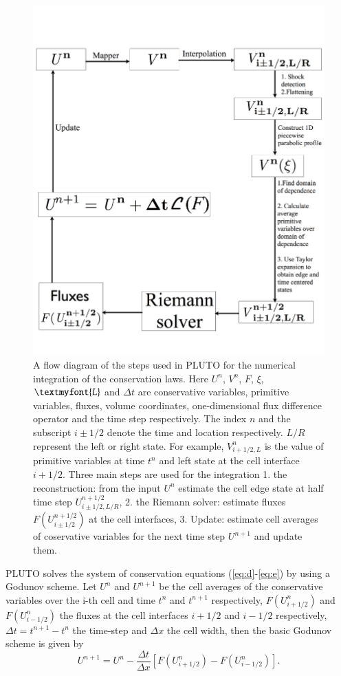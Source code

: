 \begin{figure}[h!]
\includegraphics[width=\textwidth]{pfc.png}
\caption{A flow diagram of the steps used in PLUTO for the numerical integration of the conservation laws. Here $U^n$, $V^n$, $F$, $\xi$, $\textmyfont{L}$ and $\Delta t$ are conservative variables, primitive variables, fluxes, volume coordinates, one-dimensional flux difference operator and the time step respectively. The index $n$ and the subscript $i\pm 1/2$ denote the time and location respectively. $L/R$ represent the left or right state. For example, $V^n_{i+1/2, L}$ is the value of primitive variables at time $t^n$ and left state at the cell interface $i+1/2$. Three main steps are used for the integration 1. the reconstruction: from the input $U^n$ estimate the cell edge state at half time step $U^{n+1/2}_{i\pm1/2, L/R}$, 2. the Riemann solver: estimate fluxes $F(U^{n+1/2}_{i\pm1/2})$ at the cell interfaces, 3. Update: estimate cell averages of coservative variables for the next time step $U^{n+1}$ and update them.}
\label{f:pfc}
\end{figure}

PLUTO solves the system of conservation equations (\ref{eq:d}-\ref{eq:e}) by using a Godunov scheme. Let $U^n$ and $U^{n+1}$ be the cell averages of the conservative variables over the i-th cell and time $t^n$ and $t^{n+1}$ respectively, $F\left (U_{i+1/2}^n\right )$ and $F\left ( U_{i-1/2}^n \right )$ the fluxes at the cell interfaces $i+1/2$ and $i-1/2$ respectively, $\Delta t=t^{n+1}-t^{n}$ the time-step and $\Delta x$ the cell width, then the basic Godunov scheme is given by
\begin{equation}
U^{n+1}= U^n - \frac{\Delta t}{\Delta x}\left [F\left (U^n_{i+1/2} \right )-F\left (U^n_{i-1/2} \right ) \right ].
\end{equation}



